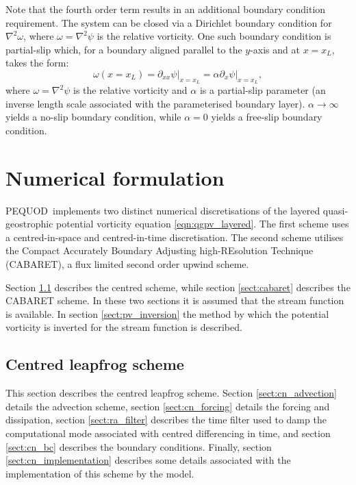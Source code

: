 \documentclass[a4paper]{book}
\newcommand{\pequod}{PEQUOD}
\begin{document}
Note that the fourth order term results in an additional boundary condition
requirement. The system can be closed via a Dirichlet boundary condition for
$\nabla^2 \omega$, where $\omega = \nabla^2 \psi$ is the relative
vorticity. One such boundary condition is partial-slip which, for a boundary
aligned parallel to the $y$-axis and at $x = x_L$, takes the form:
\begin{equation}\label{eqn:partial_slip}
  \omega \left( x = x_L \right) = \left. \partial_{xx} \psi \right|_{x = x_L} = \alpha \left. \partial_x \psi \right|_{x = x_L},
\end{equation}
where $\omega = \nabla^2 \psi$ is the relative vorticity and $\alpha$ is a
partial-slip parameter (an inverse length scale associated with the
parameterised boundary layer). $\alpha \rightarrow \infty$ yields a no-slip
boundary condition, while $\alpha = 0$ yields a free-slip boundary condition.

\chapter{Numerical formulation}

\pequod\ implements two distinct numerical discretisations of the layered
quasi-geostrophic potential vorticity equation \eqref{eqn:qgpv_layered}. The
first scheme uses a centred-in-space and centred-in-time discretisation.
The second scheme utilises the Compact Accurately Boundary Adjusting
high-REsolution Technique \linebreak (CABARET), a flux limited second order upwind scheme.

Section \ref{sect:cn} describes the centred scheme, while section
\ref{sect:cabaret} describes the CABARET scheme. In these two sections it is
assumed that the stream function is available. In section
\ref{sect:pv_inversion} the method by which the potential vorticity is inverted
for the stream function is described.

\section{Centred leapfrog scheme}\label{sect:cn}

This section describes the centred leapfrog scheme. Section
\ref{sect:cn_advection} details the advection scheme, section
\ref{sect:cn_forcing} details the forcing and dissipation, section
\ref{sect:ra_filter} describes the time filter used to damp the computational
mode associated with centred differencing in time, and section \ref{sect:cn_bc}
describes the boundary conditions. Finally, section \ref{sect:cn_implementation}
describes some details associated with the implementation of this scheme by the
model.
\end{document}
